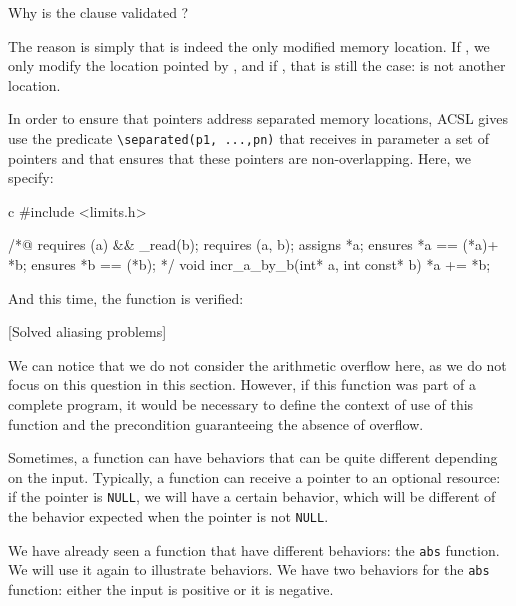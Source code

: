 \documentclass[middle]{zmdocument}
\begin{document}
\begin{Question}
  Why is the  clause validated ?

  The reason is simply that  is indeed the only modified memory
  location. If , we only modify the location pointed by
  , and if , \textbar{} that is still the case:
   is not another location.
\end{Question}


In order to ensure that pointers address separated memory locations,
ACSL gives use the predicate
\texttt{\textbackslash{}separated(p1,\ ...,pn)} that receives in
parameter a set of pointers and that ensures that these pointers are
non-overlapping. Here, we specify:



\begin{CodeBlock}{c}
#include <limits.h>

/*@
  requires \valid(a) && \valid_read(b);
  requires \separated(a, b);
  assigns  *a;
  ensures  *a == \old(*a)+ *b;
  ensures  *b == \old(*b);
*/
void incr_a_by_b(int* a, int const* b){
  *a += *b;
}
\end{CodeBlock}



And this time, the function is verified:



[Solved aliasing problems]


We can notice that we do not consider the arithmetic overflow here, as
we do not focus on this question in this section. However, if this
function was part of a complete program, it would be necessary to define
the context of use of this function and the precondition guaranteeing
the absence of overflow.





Sometimes, a function can have behaviors that can be quite different
depending on the input. Typically, a function can receive a pointer to
an optional resource: if the pointer is \texttt{NULL}, we will have a
certain behavior, which will be different of the behavior expected when
the pointer is not \texttt{NULL}.

We have already seen a function that have different behaviors: the
\texttt{abs} function. We will use it again to illustrate behaviors. We
have two behaviors for the \texttt{abs} function: either the input is
positive or it is negative.
\end{document}

